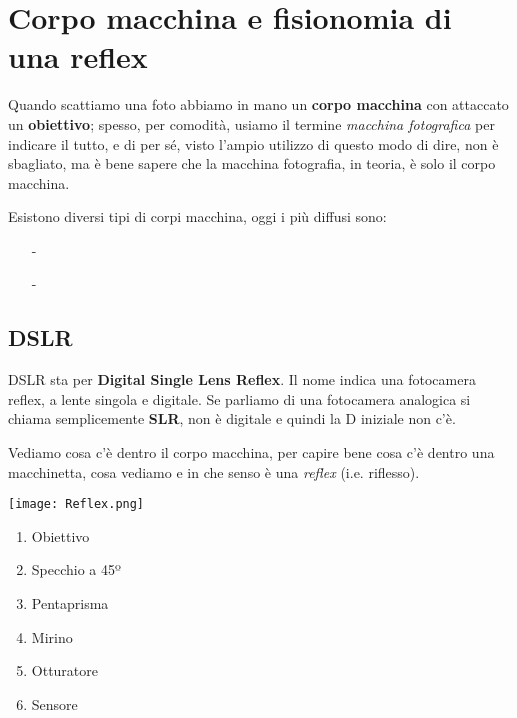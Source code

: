 \section{Corpo macchina e fisionomia di una reflex} \label{sec:fisionomia}

Quando scattiamo una foto abbiamo in mano un \textbf{corpo macchina} con attaccato un \textbf{obiettivo}; spesso, per comodità, usiamo il termine \textit{macchina fotografica} per indicare il tutto, e di per sé, visto l'ampio utilizzo di questo modo di dire, non è sbagliato, ma è bene sapere che la macchina fotografia, in teoria, è solo il corpo macchina.

Esistono diversi tipi di corpi macchina, oggi i più diffusi sono:
\begin{itemize}
    \item[-] 
    \item[-] 
\end{itemize}


\subsection{DSLR} \label{subsec:dslr}
DSLR sta per \textbf{Digital Single Lens Reflex}.\newline
Il nome indica una fotocamera reflex, a lente singola e digitale. Se parliamo di una fotocamera analogica si chiama semplicemente \textbf{SLR}, non è digitale e quindi la D iniziale non c'è.

Vediamo cosa c'è dentro il corpo macchina, per capire bene cosa c'è dentro una macchinetta, cosa vediamo e in che senso è una \textit{reflex} (i.e. riflesso).

\setlength{\columnsep}{2.8cm}
\begin{multicols}{2}
    \texttt{[image: Reflex.png]}

    \columnbreak

    \begin{enumerate}
        \setcounter{enumi}{0}
        \item Obiettivo
        \item Specchio a 45º
        \item Pentaprisma
        \item Mirino
        \item Otturatore
        \item Sensore
    \end{enumerate}
\end{multicols}

